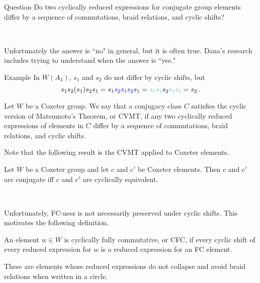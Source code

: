 \documentclass[9pt,handout]{beamer}
\begin{document}
\begin{frame}
\begin{block}{Question}
Do two cyclically reduced expressions for conjugate group elements differ by a sequence of commutations, braid relations, and cyclic shifts?
\end{block} ~\\
    \pause

    Unfortunately the answer is ``no" in general, but it is often true. Dana's research includes trying to understand when the answer is ``yes."
    
\begin{block}{Example} In $W(A_3)$, $s_1$ and $s_2$ do not differ by cyclic shifts, but
$$s_1s_2(s_1)s_2s_1=s_1{\color{blue}s_2s_1s_2}s_1={\color{turq}s_1s_1}s_2{\color{turq}s_1s_1}=s_2\,.$$
\end{block}
    \pause

\begin{definition} Let $W$ be a Coxeter group. We say that a conjugacy class $C$ satisfies the \alert{cyclic version of Matsumoto's Theorem}, or CVMT, if any two cyclically reduced expressions of elements in $C$ differ by a sequence of commutations, braid relations, and cyclic shifts.
\end{definition}
\end{frame}

\begin{frame}
    Note that the following result is the CVMT applied to Coxeter elements.

\begin{theorem} Let $W$ be a Coxeter group and let $c$ and $c'$ be Coxeter elements. Then $c$ and $c'$ are conjugate iff $c$ and $c'$ are cyclically equivalent.
\end{theorem} ~\\
    \pause

    Unfortunately, FC-ness is not necessarily preserved under cyclic shifts. This motivates the following definition.

\begin{definition} An element $w \in W$ is \alert{cyclically fully commutative}, or CFC, if every cyclic shift of every reduced expression for $w$ is a reduced expression for an FC element.
\end{definition}

    These are elements whose reduced expressions do not collapse and avoid braid relations when written in a circle.
\end{frame}
\end{document}
